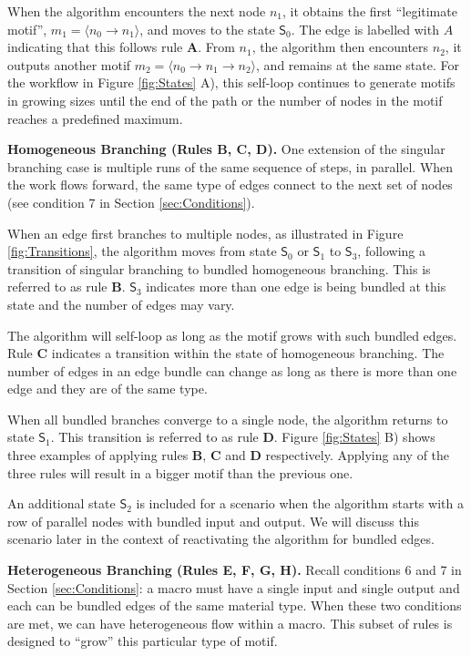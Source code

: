 When the algorithm encounters the next node $n_1$, it obtains the first ``legitimate motif'', $m_1 = \langle n_0 \rightarrow n_1 \rangle$, and moves to the state $\mathsf{S}_0$.
The edge is labelled with $A$ indicating that this follows rule \textbf{A}.
From $n_1$, the algorithm then encounters $n_2$, it outputs another motif $m_2 = \langle n_0 \rightarrow n_1 \rightarrow n_2 \rangle$, and remains at the same state.
For the workflow in Figure \ref{fig:States} A), this self-loop continues to generate motifs in growing sizes until the end of the path or the number of nodes in the motif reaches a predefined maximum. 

\noindent \textbf{Homogeneous Branching (Rules B, C, D).}
%
One extension of the singular branching case is multiple runs of the same sequence of steps, in parallel.
When the work flows forward, the same type of edges connect to the next set of nodes (see condition 7 in Section \ref{sec:Conditions}).

When an edge first branches to multiple nodes, as illustrated in Figure \ref{fig:Transitions}, the algorithm moves from state $\mathsf{S}_0$ or $\mathsf{S}_1$ to $\mathsf{S}_3$, following a transition of singular branching to bundled homogeneous branching.
This is referred to as rule \textbf{B}.
$\mathsf{S}_3$ indicates more than one edge is being bundled at this state and the number of edges may vary.

The algorithm will self-loop as long as the motif grows with such bundled edges.
Rule \textbf{C} indicates a transition within the state of homogeneous branching.
The number of edges in an edge bundle can change as long as there is more than one edge and they are of the same type.

When all bundled branches converge to a single node, the algorithm returns to state $\mathsf{S}_1$.
This transition is referred to as rule \textbf{D}.
Figure \ref{fig:States} B) shows three examples of applying rules \textbf{B}, \textbf{C} and \textbf{D} respectively.
Applying any of the three rules will result in a bigger motif than the previous one.

An additional state $\mathsf{S}_2$ is included for a scenario when the algorithm starts with a row of parallel nodes with bundled input and output.
We will discuss this scenario later in the context of reactivating the algorithm for bundled edges.

\noindent \textbf{Heterogeneous Branching (Rules E, F, G, H).}
%
Recall conditions 6 and 7 in Section \ref{sec:Conditions}: a macro must have a single input and single output and each can be bundled edges of the same material type.
When these two conditions are met, we can have heterogeneous flow within a macro.
This subset of rules is designed to ``grow'' this particular type of motif.

